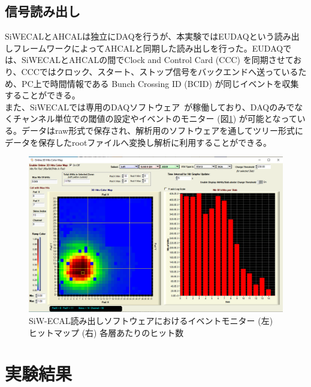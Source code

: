\subsection{信号読み出し}
SiWECALとAHCALは独立にDAQを行うが、本実験ではEUDAQという読み出しフレームワークによってAHCALと同期した読み出しを行った。EUDAQでは、SiWECALとAHCALの間でClock and Control Card (CCC) を同期させており、CCCではクロック、スタート、ストップ信号をバックエンドへ送っているため、PC上で時間情報である Bunch Crossing ID (BCID) が同じイベントを収集することができる。\\
また、SiWECALでは専用のDAQソフトウェア~\cite{ecalsoft}が稼働しており、DAQのみでなくチャンネル単位での閾値の設定やイベントのモニター (図\ref{monitor}) が可能となっている。データはraw形式で保存され、解析用のソフトウェアを通してツリー形式にデータを保存したrootファイルへ変換し解析に利用することができる。
\begin{figure}[H]
\begin{center}
 \includegraphics[keepaspectratio, scale=0.2]
 	{Figure/Beamtest/monitor.png}
 		\caption[SiW-ECALのイベントモニター]{SiW-ECAL読み出しソフトウェアにおけるイベントモニター (左) ヒットマップ (右) 各層あたりのヒット数}
		\label{monitor}
\end{center}
\end{figure}
\section{実験結果}
